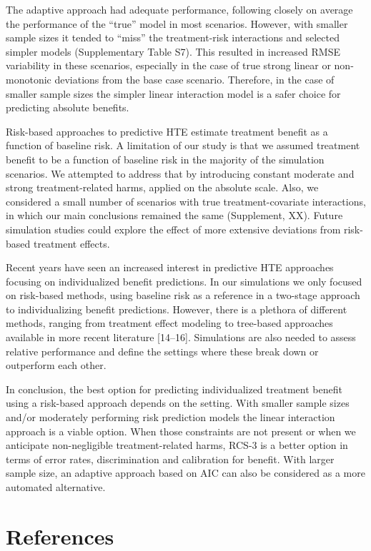 \documentclass{article}
\begin{document}
The adaptive approach had adequate performance, following closely on
average the performance of the ``true'' model in most scenarios.
However, with smaller sample sizes it tended to ``miss'' the
treatment-risk interactions and selected simpler models (Supplementary
Table S7). This resulted in increased RMSE variability in these
scenarios, especially in the case of true strong linear or non-monotonic
deviations from the base case scenario. Therefore, in the case of
smaller sample sizes the simpler linear interaction model is a safer
choice for predicting absolute benefits.

Risk-based approaches to predictive HTE estimate treatment benefit as a
function of baseline risk. A limitation of our study is that we assumed
treatment benefit to be a function of baseline risk in the majority of
the simulation scenarios. We attempted to address that by introducing
constant moderate and strong treatment-related harms, applied on the
absolute scale. Also, we considered a small number of scenarios with
true treatment-covariate interactions, in which our main conclusions
remained the same (Supplement, XX). Future simulation studies could
explore the effect of more extensive deviations from risk-based
treatment effects.

Recent years have seen an increased interest in predictive HTE
approaches focusing on individualized benefit predictions. In our
simulations we only focused on risk-based methods, using baseline risk
as a reference in a two-stage approach to individualizing benefit
predictions. However, there is a plethora of different methods, ranging
from treatment effect modeling to tree-based approaches available in
more recent literature {[}14--16{]}. Simulations are also needed to
assess relative performance and define the settings where these break
down or outperform each other.

In conclusion, the best option for predicting individualized treatment
benefit using a risk-based approach depends on the setting. With smaller
sample sizes and/or moderately performing risk prediction models the
linear interaction approach is a viable option. When those constraints
are not present or when we anticipate non-negligible treatment-related
harms, RCS-3 is a better option in terms of error rates, discrimination
and calibration for benefit. With larger sample size, an adaptive
approach based on AIC can also be considered as a more automated
alternative.

\newpage

\hypertarget{references}{%
\section{References}\label{references}}
\end{document}
